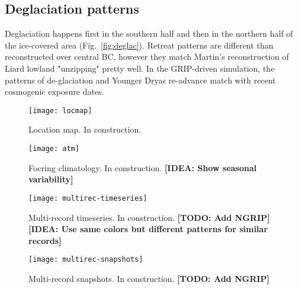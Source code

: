 \documentclass[tc, ms]{copernicus}
\def\idea#1{\textcolor[rgb]{0,0.5,0}{\textbf{[IDEA: #1]}}}
\def\todo#1{\textcolor[rgb]{0.5,0,0}{\textbf{[TODO: #1]}}}
\begin{document}
\subsection{Deglaciation patterns}

Deglaciation happens first in the southern half and then in the northern half
of the ice-covered area (Fig.~\ref{fig:deglac}). Retreat patterns are different
than reconstructed over central BC, however they match Martin's reconstruction
of Liard lowland "unzipping" pretty well. In the GRIP-driven simulation, the
patterns of de-glaciation and Younger Dryas re-advance match with recent
cosmogenic exposure dates.

\conclusions
\label{sec:concl}


%


\begin{figure}
  \texttt{[image: locmap]}
  \caption{Location map. In construction.}
  \label{fig:locmap}
\end{figure}

\begin{figure}
  \texttt{[image: atm]}
  \caption{Focring climatology. In construction.
           \idea{Show seasonal variability}}
  \label{fig:atm}
\end{figure}

\begin{figure}
  \texttt{[image: multirec-timeseries]}
  \caption{Multi-record timeseries. In construction.
           \todo{Add NGRIP}
           \idea{Use same colors but different patterns for similar records}}
  \label{fig:multirec-timeseries}
\end{figure}

\begin{figure}
  \texttt{[image: multirec-snapshots]}
  \caption{Multi-record snapshots. In construction.
           \todo{Add NGRIP}}
  \label{fig:multirec-snapshots}
\end{figure}
\end{document}
